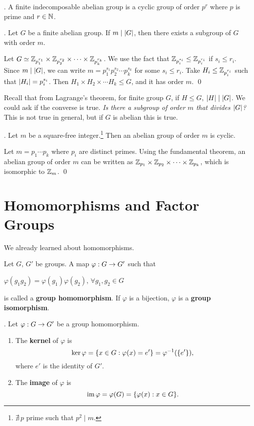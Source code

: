 \thm. A finite indecomposable abelian group is a cyclic group of order \(p^r\) where \(p\) is prime and \(r \in \mathbb{N}\).

\thm. Let \(G\) be a finite abelian group. If \(m \mid \left| G \right|\), then there exists a subgroup of \(G\) with order \(m\).

\pf Let \(G \simeq \mathbb{Z}_{p_1^{r_1}} \times \mathbb{Z}_{p_2^{r_2}} \times \cdots \times \mathbb{Z}_{p_k^{r_k}}\). We use the fact that \(\mathbb{Z}_{p_i^{s_i}} \leq \mathbb{Z}_{p_i^{r_i}}\) if \(s_i \leq r_i\). Since \(m \mid \left| G \right|\), we can write \(m = p_1^{s_1}p_2^{s_2} \cdots p_k^{s_k}\) for some \(s_i \leq r_i\). Take \(H_i \leq \mathbb{Z}_{p_i^{r_i}}\) such that \(\left| H_i \right| = p_i^{s_i}\). Then \(H_1 \times H_2 \times \cdots H_k \leq G\), and it has order \(m\). \qed

\pagebreak
Recall that from Lagrange's theorem, for finite group \(G\), if \(H \leq G\), \(\left| H \right| \mid \left| G \right|\). We could ask if the converse is true. \textit{Is there a subgroup of order \(m\) that divides \(\left| G \right|\)?} This is not true in general, but if \(G\) is abelian this is true.

\thm. Let \(m\) be a square-free integer.\footnote{\(\nexists\, p\) prime such that \(p^2 \mid m\).} Then an abelian group of order \(m\) is cyclic.

\pf Let \(m = p_1 \cdots p_k\) where \(p_i\) are distinct primes. Using the fundamental theorem, an abelian group of order \(m\) can be written as \(\mathbb{Z}_{p_1} \times \mathbb{Z}_{p_2} \times \cdots \times \mathbb{Z}_{p_k}\), which is isomorphic to \(\mathbb{Z}_m\). \qed

\pagebreak

\setcounter{topic}{12}
\chapter{Homomorphisms and Factor Groups}


We already learned about homomorphisms.

\recall Let \(G\), \(G'\) be groups. A map \(\varphi: G \rightarrow G'\) such that
\begin{center}
    \(\varphi(g_1 g_2) = \varphi(g_1) \varphi(g_2)\), \quad \(\forall g_1, g_2 \in G\)
\end{center}
is called a \textbf{group homomorphism}. If \(\varphi\) is a bijection, \(\varphi\) is a \textbf{group isomorphism}.

. Let \(\varphi: G \rightarrow G'\) be a group homomorphism.
\begin{enumerate}
    \item {} The \textbf{kernel} of \(\varphi\) is
    \[
        \ker \varphi = \{x \in G : \varphi(x) = e'\} = \varphi^{-1}(\{e'\}),
    \]
    where \(e'\) is the identity of \(G'\).
    \item {} The \textbf{image} of \(\varphi\) is
    \[
        \operatorname{im} \varphi = \varphi(G) = \{\varphi(x) : x \in G\}.
    \]
\end{enumerate}

\smallskip
